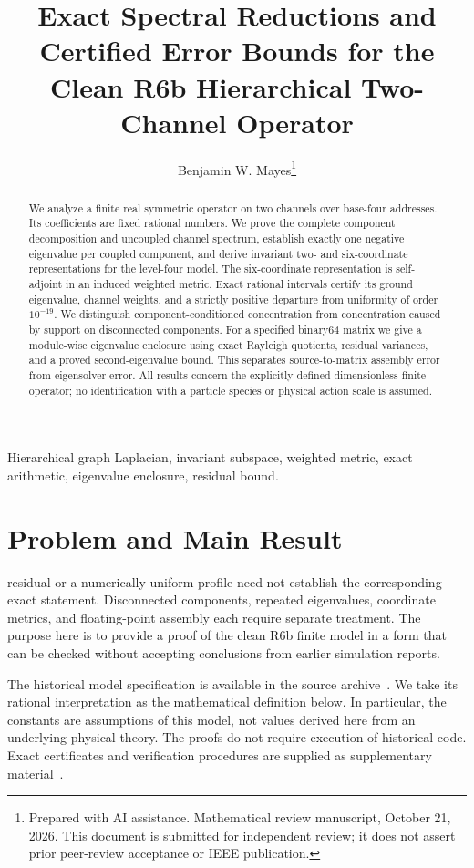 \documentclass[journal,a4paper,10pt]{IEEEtran}
\title{Exact Spectral Reductions and Certified Error Bounds for the Clean R6b Hierarchical Two-Channel Operator}
\author{Benjamin W. Mayes\thanks{Prepared with AI assistance. Mathematical review manuscript, October 21, 2026. This document is submitted for independent review; it does not assert prior peer-review acceptance or IEEE publication.}}
\theoremstyle{definition}\newtheorem{definition}[theorem]{Definition}
\theoremstyle{remark}\newtheorem{remark}[theorem]{Remark}
\begin{document}
\maketitle
\begin{abstract}
We analyze a finite real symmetric operator on two channels over base-four addresses. Its coefficients are fixed rational numbers. We prove the complete component decomposition and uncoupled channel spectrum, establish exactly one negative eigenvalue per coupled component, and derive invariant two- and six-coordinate representations for the level-four model. The six-coordinate representation is self-adjoint in an induced weighted metric. Exact rational intervals certify its ground eigenvalue, channel weights, and a strictly positive departure from uniformity of order $10^{-19}$. We distinguish component-conditioned concentration from concentration caused by support on disconnected components. For a specified binary64 matrix we give a module-wise eigenvalue enclosure using exact Rayleigh quotients, residual variances, and a proved second-eigenvalue bound. This separates source-to-matrix assembly error from eigensolver error. All results concern the explicitly defined dimensionless finite operator; no identification with a particle species or physical action scale is assumed.
\end{abstract}
\begin{IEEEkeywords}
Hierarchical graph Laplacian, invariant subspace, weighted metric, exact arithmetic, eigenvalue enclosure, residual bound.
\end{IEEEkeywords}

\section{Problem and Main Result}
 residual or a numerically uniform profile need not establish the corresponding exact statement. Disconnected components, repeated eigenvalues, coordinate metrics, and floating-point assembly each require separate treatment. The purpose here is to provide a proof of the clean R6b finite model in a form that can be checked without accepting conclusions from earlier simulation reports.

The historical model specification is available in the source archive~\cite{source}. We take its rational interpretation as the mathematical definition below. In particular, the constants are assumptions of this model, not values derived here from an underlying physical theory. The proofs do not require execution of historical code. Exact certificates and verification procedures are supplied as supplementary material~\cite{supplement}.
\end{document}
